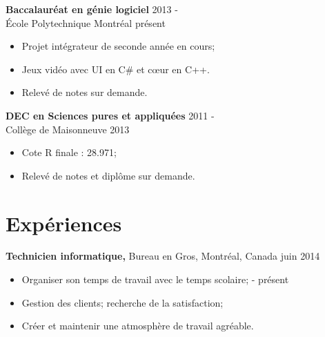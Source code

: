 \documentclass[margin]{res}
\begin{document}
\begin{resume}
  {\bf Baccalauréat en g\'{e}nie logiciel} \hfill 2013 -\\ 
  \'{E}cole Polytechnique Montr\'{e}al \hfill pr\'{e}sent
  \begin{itemize} \itemsep -2pt
\item Projet int\'egrateur de seconde ann\'ee en cours;
\item Jeux vid\'eo avec UI en C\# et c\oe{}ur en C++. 
  \item Relev\'{e} de notes sur demande.
  \end{itemize}
  
  
  {\bf DEC en Sciences pures et appliqu\'{e}es} \hfill 2011 -\\
  Coll\`{e}ge de Maisonneuve \hfill 2013
  \begin{itemize} \itemsep -2pt
  \item Cote R finale : 28.971; 
  \item Relev\'{e} de notes et dipl\^{o}me sur demande.
  \end{itemize}


  
  \section{Exp\'{e}riences}
  
  {\bf Technicien informatique,} Bureau en Gros, Montr\'{e}al, Canada \hfill juin 2014
  \begin{itemize} \itemsep -2pt  %
  \item Organiser son temps de travail avec le temps scolaire; \hfill - pr\'{e}sent
  \item Gestion des clients; recherche de la satisfaction;
  \item Cr\'{e}er et maintenir une atmosph\`{e}re de travail agr\'{e}able. 
  \end{itemize}
  

\end{resume}
\end{document}
